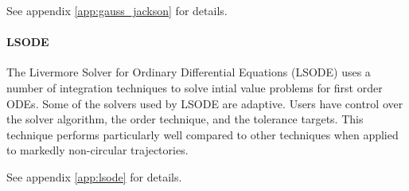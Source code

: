 See appendix \ref{app:gauss_jackson} for details.

\paragraph{LSODE}
The Livermore Solver for Ordinary Differential Equations (LSODE) uses a number
of integration techniques to solve intial value problems for first order ODEs.
Some of the solvers used by LSODE are adaptive. Users have control over the
solver algorithm, the order technique, and the tolerance targets.
This technique performs particularly well compared to other techniques when
applied to markedly non-circular trajectories.

See appendix \ref{app:lsode} for details.
